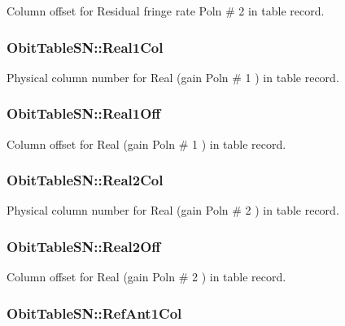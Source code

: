 Column offset for Residual fringe rate Poln \# 2 in table record. 

\subsubsection{ {\bf Obit\-Table\-SN::Real1Col}}\label{structObitTableSN_o41}


Physical column number for Real (gain Poln \# 1 ) in table record. 

\subsubsection{ {\bf Obit\-Table\-SN::Real1Off}}\label{structObitTableSN_o40}


Column offset for Real (gain Poln \# 1 ) in table record. 

\subsubsection{ {\bf Obit\-Table\-SN::Real2Col}}\label{structObitTableSN_o55}


Physical column number for Real (gain Poln \# 2 ) in table record. 

\subsubsection{ {\bf Obit\-Table\-SN::Real2Off}}\label{structObitTableSN_o54}


Column offset for Real (gain Poln \# 2 ) in table record. 

\subsubsection{ {\bf Obit\-Table\-SN::Ref\-Ant1Col}}\label{structObitTableSN_o51}



